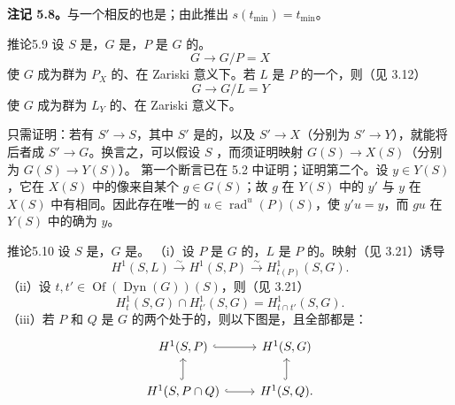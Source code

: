\textbf{注记 5.8。}与一个相反的也是；由此推出 $s(t_{\min})=t_{\min}$。
\begin{SGAresult}{推论}{5.9}
设 $S$ 是，$G$ 是，$P$ 是 $G$ 的。
\[
 G\longrightarrow G/P=X
\]
使 $G$ 成为群为 $P_X$ 的、在 Zariski 意义下。若 $L$ 是 $P$ 的一个，则（见 3.12）
\[
 G\longrightarrow G/L=Y
\]
使 $G$ 成为群为 $L_Y$ 的、在 Zariski 意义下。
\end{SGAresult}
只需证明：若有 $S'\to S$，其中 $S'$ 是的，以及 $S'\to X$（分别为 $S'\to Y$），就能将后者成 $S'\to G$。换言之，可以假设 $S$ ，而须证明映射 $G(S)\to X(S)$（分别为 $G(S)\to Y(S)$）。
第一个断言已在 5.2 中证明；证明第二个。设 $y\in Y(S)$，它在 $X(S)$ 中的像来自某个 $g\in G(S)$；故 $g$ 在 $Y(S)$ 中的 $y'$ 与 $y$ 在 $X(S)$ 中有相同。因此存在唯一的 $u\in\operatorname{rad}^{u}(P)(S)$，使 $y'u=y$，而 $gu$ 在 $Y(S)$ 中的确为 $y$。
\begin{SGAresult}{推论}{5.10}
设 $S$ 是，$G$ 是。
（i）设 $P$ 是 $G$ 的，$L$ 是 $P$ 的。映射（见 3.21）诱导
\[
 H^1(S,L)\xrightarrow{\sim}H^1(S,P)\xrightarrow{\sim}H^1_{t(P)}(S,G).
\]
（ii）设 $t,t'\in\operatorname{Of}(\operatorname{Dyn}(G))(S)$，则（见 3.21）
\[
 H^1_t(S,G)\cap H^1_{t'}(S,G)=H^1_{t\cap t'}(S,G).
\]
（iii）若 $P$ 和 $Q$ 是 $G$ 的两个处于的，则以下图是，且全部都是：
\[
\begin{tikzcd}
 H^1(S,P)\arrow[r,hook]&H^1(S,G)\\
 H^1(S,P\cap Q)\arrow[u,hook]\arrow[r,hook]&H^1(S,Q)\arrow[u,hook].
\end{tikzcd}
\]
\end{SGAresult}
